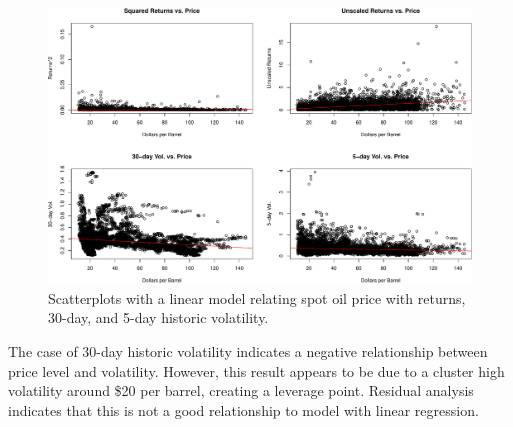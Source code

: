 \documentclass[]{article}
\begin{document}
\begin{figure}[htbp]
\centering
\includegraphics{Figs/unnamed-chunk-8-1.pdf}
\caption{Scatterplots with a linear model relating spot oil price with
returns, 30-day, and 5-day historic volatility.}
\end{figure}

The case of 30-day historic volatility indicates a negative relationship
between price level and volatility. However, this result appears to be
due to a cluster high volatility around \$20 per barrel, creating a
leverage point. Residual analysis indicates that this is not a good
relationship to model with linear regression.
\end{document}

